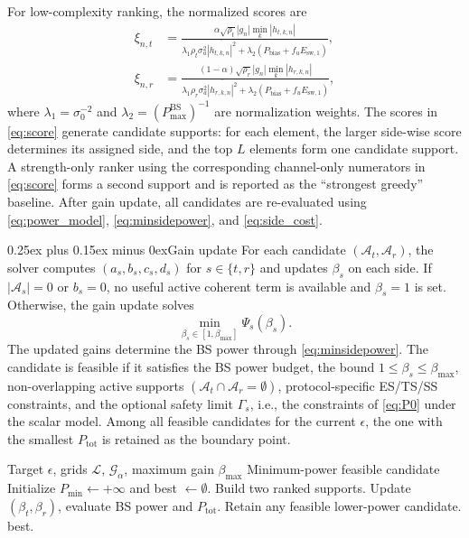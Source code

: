 \documentclass[journal]{IEEEtran}
\makeatletter
\def\subsection{\@startsection{subsection}{2}{\z@}{1.05ex plus 0.35ex minus 0.2ex}%
{0.25ex plus 0.15ex minus 0ex}{\normalfont\normalsize\itshape}}%
\makeatother
\begin{document}
For low-complexity ranking, the normalized scores are
\begin{equation}
\begin{aligned}
\xi_{n,t}
&=\frac{\alpha\sqrt{\rho_t}|g_n|\min_k|h_{t,k,n}|}
{\lambda_1\rho_t\sigma_a^2\overline{|h_{t,k,n}|^2}
+\lambda_2(P_{\mathrm{bias}}+f_uE_{\mathrm{sw},1})},\\
\xi_{n,r}
&=\frac{(1-\alpha)\sqrt{\rho_r}|g_n|\min_k|h_{r,k,n}|}
{\lambda_1\rho_r\sigma_a^2\overline{|h_{r,k,n}|^2}
+\lambda_2(P_{\mathrm{bias}}+f_uE_{\mathrm{sw},1})},
\end{aligned}
\label{eq:score}
\end{equation}
where $\lambda_1=\sigma_0^{-2}$ and $\lambda_2=(P_{\max}^{\mathrm{BS}})^{-1}$ are normalization weights. The scores in \eqref{eq:score} generate candidate supports: for each element, the larger side-wise score determines its assigned side, and the top $L$ elements form one candidate support. A strength-only ranker using the corresponding channel-only numerators in \eqref{eq:score} forms a second support and is reported as the ``strongest greedy'' baseline. After gain update, all candidates are re-evaluated using \eqref{eq:power_model}, \eqref{eq:minsidepower}, and \eqref{eq:side_cost}.

\subsection{Gain update}
For each candidate $(\mathcal{A}_t,\mathcal{A}_r)$, the solver computes $(a_s,b_s,c_s,d_s)$ for $s\in\{t,r\}$ and updates $\beta_s$ on each side. If $|\mathcal{A}_s|=0$ or $b_s=0$, no useful active coherent term is available and $\beta_s=1$ is set. Otherwise, the gain update solves
\[
\min_{\beta_s\in[1,\beta_{\max}]}\Psi_s(\beta_s).
\]
The updated gains determine the BS power through \eqref{eq:minsidepower}. The candidate is feasible if it satisfies the BS power budget, the bound $1\le\beta_s\le\beta_{\max}$, non-overlapping active supports $(\mathcal{A}_t\cap\mathcal{A}_r=\emptyset)$, protocol-specific ES/TS/SS constraints, and the optional safety limit $\Gamma_s$, i.e., the constraints of \eqref{eq:P0} under the scalar model. Among all feasible candidates for the current $\epsilon$, the one with the smallest $P_{\mathrm{tot}}$ is retained as the boundary point.

\begin{algorithm}[H]
\caption{Sparse-Activation Solver}
\label{alg:solver}
\begin{algorithmic}[1]
\Require Target $\epsilon$, grids $\mathcal{L}$, $\mathcal{G}_\alpha$, maximum gain $\beta_{\max}$
\Ensure Minimum-power feasible candidate
\State Initialize $P_{\min}\gets+\infty$ and best $\gets\emptyset$.
    \State Build two ranked supports.
    \State Update $(\beta_t,\beta_r)$, evaluate BS power and $P_{\mathrm{tot}}$.
    \State Retain any feasible lower-power candidate.
\EndFor
\State \Return best.
\end{algorithmic}
\end{algorithm}
\end{document}
